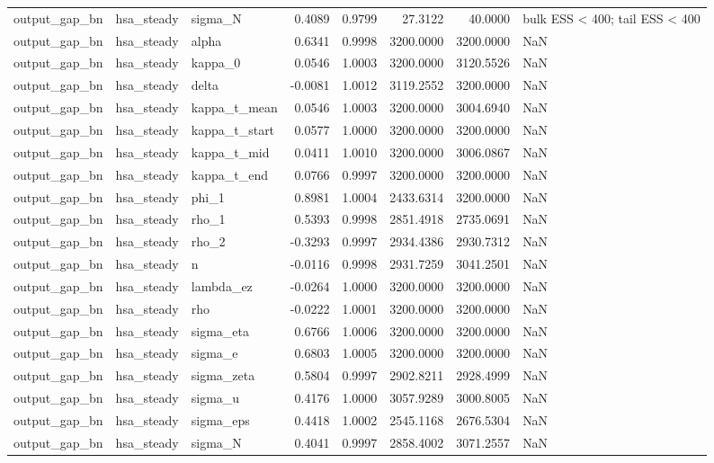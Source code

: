 \begin{tabular}{lllrrrrl}
output\_gap\_bn & hsa\_steady & sigma\_N & 0.4089 & 0.9799 & 27.3122 & 40.0000 & bulk ESS < 400; tail ESS < 400 \\
output\_gap\_bn & hsa\_steady & alpha & 0.6341 & 0.9998 & 3200.0000 & 3200.0000 & NaN \\
output\_gap\_bn & hsa\_steady & kappa\_0 & 0.0546 & 1.0003 & 3200.0000 & 3120.5526 & NaN \\
output\_gap\_bn & hsa\_steady & delta & -0.0081 & 1.0012 & 3119.2552 & 3200.0000 & NaN \\
output\_gap\_bn & hsa\_steady & kappa\_t\_mean & 0.0546 & 1.0003 & 3200.0000 & 3004.6940 & NaN \\
output\_gap\_bn & hsa\_steady & kappa\_t\_start & 0.0577 & 1.0000 & 3200.0000 & 3200.0000 & NaN \\
output\_gap\_bn & hsa\_steady & kappa\_t\_mid & 0.0411 & 1.0010 & 3200.0000 & 3006.0867 & NaN \\
output\_gap\_bn & hsa\_steady & kappa\_t\_end & 0.0766 & 0.9997 & 3200.0000 & 3200.0000 & NaN \\
output\_gap\_bn & hsa\_steady & phi\_1 & 0.8981 & 1.0004 & 2433.6314 & 3200.0000 & NaN \\
output\_gap\_bn & hsa\_steady & rho\_1 & 0.5393 & 0.9998 & 2851.4918 & 2735.0691 & NaN \\
output\_gap\_bn & hsa\_steady & rho\_2 & -0.3293 & 0.9997 & 2934.4386 & 2930.7312 & NaN \\
output\_gap\_bn & hsa\_steady & n & -0.0116 & 0.9998 & 2931.7259 & 3041.2501 & NaN \\
output\_gap\_bn & hsa\_steady & lambda\_ez & -0.0264 & 1.0000 & 3200.0000 & 3200.0000 & NaN \\
output\_gap\_bn & hsa\_steady & rho & -0.0222 & 1.0001 & 3200.0000 & 3200.0000 & NaN \\
output\_gap\_bn & hsa\_steady & sigma\_eta & 0.6766 & 1.0006 & 3200.0000 & 3200.0000 & NaN \\
output\_gap\_bn & hsa\_steady & sigma\_e & 0.6803 & 1.0005 & 3200.0000 & 3200.0000 & NaN \\
output\_gap\_bn & hsa\_steady & sigma\_zeta & 0.5804 & 0.9997 & 2902.8211 & 2928.4999 & NaN \\
output\_gap\_bn & hsa\_steady & sigma\_u & 0.4176 & 1.0000 & 3057.9289 & 3000.8005 & NaN \\
output\_gap\_bn & hsa\_steady & sigma\_eps & 0.4418 & 1.0002 & 2545.1168 & 2676.5304 & NaN \\
output\_gap\_bn & hsa\_steady & sigma\_N & 0.4041 & 0.9997 & 2858.4002 & 3071.2557 & NaN \\

\end{tabular}
